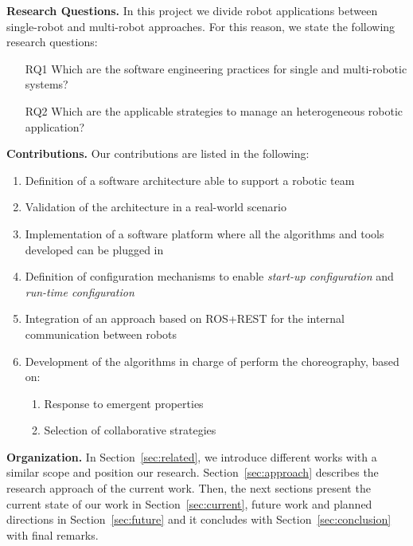\textbf{Research Questions.} 
In this project we divide robot applications between single-robot and multi-robot approaches.
For this reason, we state the following research questions:
\begin{itemize}
\item[RQ1] Which are the software engineering practices for single and multi-robotic systems? 
\item[RQ2] Which are the applicable strategies to manage an heterogeneous robotic application?
\end{itemize}

\textbf{Contributions.} 
Our contributions are listed in the following:

\begin{enumerate}
\item Definition of a software architecture able to support a robotic team
\item Validation of the architecture in a real-world scenario
\item Implementation of a software platform where all the algorithms and tools developed can be plugged in 
\item Definition of configuration mechanisms to enable \emph{start-up configuration} and \emph{run-time configuration}
\item Integration of an approach based on ROS+REST for the internal communication between robots
\item Development of the algorithms in charge of perform the choreography, based on:
\begin{enumerate}
\item Response to emergent properties
\item Selection of collaborative strategies
\end{enumerate}
\end{enumerate}

\textbf{Organization.} 
In Section~\ref{sec:related}, we introduce different works with a similar scope and position our research.
Section~\ref{sec:approach} describes the research approach of the current work.
Then, the next sections present the current state of our work in Section~\ref{sec:current}, future work and planned directions in Section~\ref{sec:future} and it concludes with Section~\ref{sec:conclusion} with final remarks.